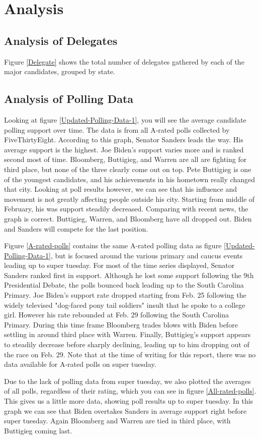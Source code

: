 \section{Analysis}\label{analysis}

\subsection{Analysis of Delegates}

Figure \ref{Delegate} shows the total number of delegates gathered by each of the major candidates, grouped by state.

\subsection{Analysis of Polling Data}

Looking at figure \ref{Updated-Polling-Data-1}, you will see the average candidate polling support over time. The data is from all A-rated polls collected by FiveThirtyEight. According to this graph, Senator Sanders leads the way. His average support is the highest. Joe Biden's support varies more and is ranked second most of time. Bloomberg, Buttigieg, and Warren are all are fighting for third place, but none of the three clearly come out on top. Pete Buttigieg is one of the youngest candidates, and his achievements in his hometown really changed that city. Looking at poll results however, we can see that his influence and movement is not greatly affecting people outside his city. Starting from middle of February, his was support steadily decreased. Comparing with recent news, the graph is correct. Buttigieg, Warren, and Bloomberg have all dropped out. Biden and Sanders will compete for the last position.

Figure \ref{A-rated-polls} contains the same A-rated polling data as figure \ref{Updated-Polling-Data-1}, but is focused around the various primary and caucus events leading up to super tuesday. For most of the time series displayed, Senator Sanders ranked first in support. Although he lost some support following the 9th Presidential Debate, the polls bounced back leading up to the South Carolina Primary. Joe Biden's support rate dropped starting from Feb. 25 following the widely televised "dog-faced pony tail soldiers" insult that he spoke to a college girl. However his rate rebounded at Feb. 29 following the South Carolina Primary. During this time frame Bloomberg trades blows with Biden before settling in around third place with Warren. Finally, Buttigieg's support appears to steadily decrease before sharply declining, leading up to him dropping out of the race on Feb. 29. Note that at the time of writing for this report, there was no data available for A-rated polls on super tuesday.

Due to the lack of polling data from super tuesday, we also plotted the averages of all polls, regardless of their rating, which you can see in figure \ref{All-rated-polls}. This gives us a little more data, showing poll results up to super tuesday. In this graph we can see that Biden overtakes Sanders in average support right before super tuesday. Again Bloomberg and Warren are tied in third place, with Buttigieg coming last.